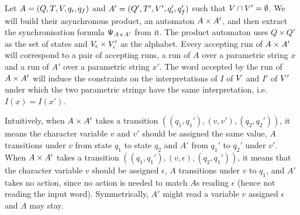 \documentclass[sigplan,review,anonymous]{acmart}\settopmatter{printfolios=true,printccs=false,printacmref=false}
\begin{document}
Let $A = (Q,T,V,q_i,q_f)$ and ${A'} = (Q',T',V',q_i',q_f')$ such that $V \cap V' = \emptyset$. 
We will build their asynchronous product, an automaton $A \times A'$, 
and then extract the synchronisation formula $\Psi_{A \times A'}$ from it.
%
The product automaton uses $Q\times Q'$ as the set of states and 
$V_\epsilon\times V'_\epsilon$
as the alphabet. 
%
Every accepting run of $A \times A'$ will correspond to a pair of accepting runs, 
a run of $A$ over a parametric string $x$ and a run of ${A'}$ over a parametric string $x'$. 
The word accepted by the run of $A \times A'$ will induce the constraints on the interpretations of $I$ of $V$ and $I'$ of $V'$ under which the two parametric strings have the same interpretation, i.e. $I(x) = I(x')$. 

Intuitively, when $A \times A'$ takes a transition $((q_1,q_1'), (v,v'),(q_2,q_2'))$, 
it means the character variable $v$ and $v'$ should be assigned the same value,
$A$ transitions under $v$ from state $q_1$ to state $q_2$ and ${A'}$ from $q_1'$ to $q_2'$ under $v'$.
%
When $A \times A'$ takes a transition $((q_1,q_1'), (v,\epsilon),(q_2,q_1'))$, 
it means that the character variable $v$ should be assigned $\epsilon$, 
$A$ transitions under $v$ to $q_1$, and ${A'}$ takes no action, since no action is needed to match $A$s reading $\epsilon$ (hence not reading the input word). Symmetrically, ${A'}$ might read a variable $v$ assigned $\epsilon$ and $A$ may stay.
\end{document}
